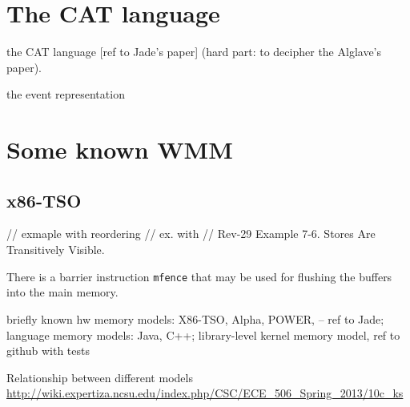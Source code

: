 \section{The CAT language}

the CAT language [ref to Jade's paper] (hard part: to decipher the Alglave's paper).

the event representation

\section{Some known WMM}

\subsection{x86-TSO}
\label{ch:wmm:x86}
// exmaple with reordering
// ex. with 
// Rev-29 Example 7-6. Stores Are Transitively Visible. %

There is a barrier instruction \texttt{mfence} that may be used for flushing the buffers into the main memory.

briefly known hw memory models: X86-TSO, Alpha, POWER, -- ref to Jade;
language memory models: Java, C++;
library-level kernel memory model, ref to github with tests

Relationship between different models \url{http://wiki.expertiza.ncsu.edu/index.php/CSC/ECE_506_Spring_2013/10c_ks}

  